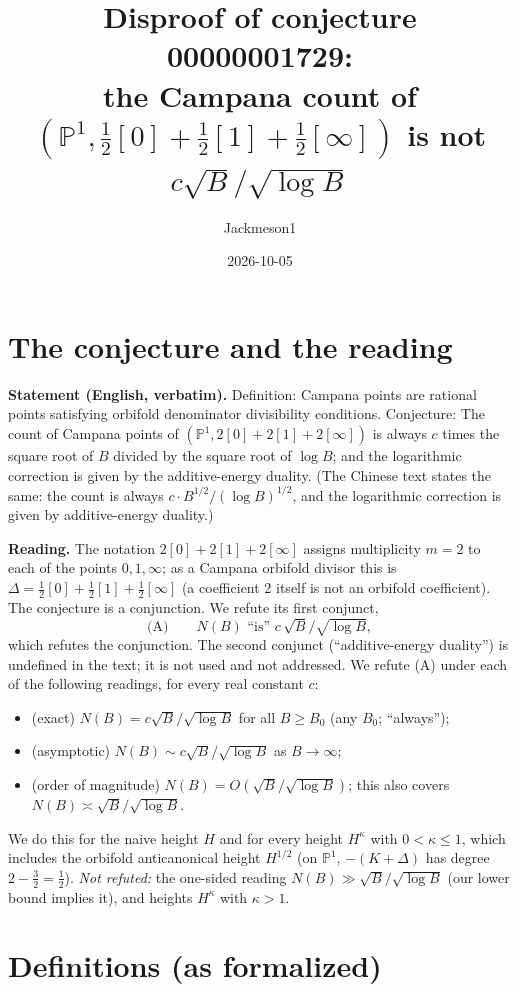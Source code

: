 \documentclass[11pt]{article}
\title{Disproof of conjecture 00000001729:\\ the Campana count of $(\mathbb{P}^1,\tfrac12[0]+\tfrac12[1]+\tfrac12[\infty])$
is not $c\sqrt{B}/\sqrt{\log B}$}
\author{Jackmeson1}
\date{2026-10-05}
\theoremstyle{definition}
\begin{document}
\maketitle

\section{The conjecture and the reading}

\textbf{Statement (English, verbatim).} Definition: Campana points are rational points satisfying
orbifold denominator divisibility conditions. Conjecture: The count of Campana points of
$(\mathbb{P}^1, 2[0]+2[1]+2[\infty])$ is always $c$ times the square root of $B$ divided by the square
root of $\log B$; and the logarithmic correction is given by the additive-energy duality. (The Chinese
text states the same: the count is always $c\cdot B^{1/2}/(\log B)^{1/2}$, and the logarithmic
correction is given by additive-energy duality.)

\textbf{Reading.} The notation $2[0]+2[1]+2[\infty]$ assigns multiplicity $m=2$ to each of the points
$0,1,\infty$; as a Campana orbifold divisor this is $\Delta=\tfrac12[0]+\tfrac12[1]+\tfrac12[\infty]$
(a coefficient $2$ itself is not an orbifold coefficient). The conjecture is a conjunction. We refute
its first conjunct,
\[
\text{(A)}\qquad N(B) \text{ ``is'' } c\,\sqrt{B}/\sqrt{\log B},
\]
which refutes the conjunction. The second conjunct (``additive-energy duality'') is undefined in the
text; it is not used and not addressed. We refute (A) under each of the following readings, for every
real constant $c$:
\begin{itemize}
\item (exact) $N(B)=c\sqrt B/\sqrt{\log B}$ for all $B\ge B_0$ (any $B_0$; ``always'');
\item (asymptotic) $N(B)\sim c\sqrt B/\sqrt{\log B}$ as $B\to\infty$;
\item (order of magnitude) $N(B)=O(\sqrt B/\sqrt{\log B})$; this also covers $N(B)\asymp\sqrt B/\sqrt{\log B}$.
\end{itemize}
We do this for the naive height $H$ and for every height $H^\kappa$ with $0<\kappa\le 1$, which
includes the orbifold anticanonical height $H^{1/2}$ (on $\mathbb{P}^1$, $-(K+\Delta)$ has degree
$2-\tfrac32=\tfrac12$). \emph{Not refuted:} the one-sided reading $N(B)\gg \sqrt B/\sqrt{\log B}$
(our lower bound implies it), and heights $H^\kappa$ with $\kappa>1$.

\section{Definitions (as formalized)}
\end{document}
